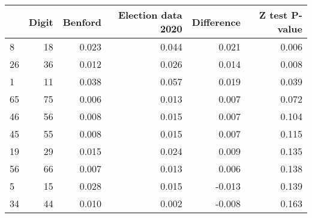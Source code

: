 \begin{tabular}{lrrrrr}
\toprule
{} &  Digit &  Benford &  Election data 2020 &  Difference &  Z test P-value \\
\midrule
8  &     18 &    0.023 &               0.044 &       0.021 &           0.006 \\
26 &     36 &    0.012 &               0.026 &       0.014 &           0.008 \\
1  &     11 &    0.038 &               0.057 &       0.019 &           0.039 \\
65 &     75 &    0.006 &               0.013 &       0.007 &           0.072 \\
46 &     56 &    0.008 &               0.015 &       0.007 &           0.104 \\
45 &     55 &    0.008 &               0.015 &       0.007 &           0.115 \\
19 &     29 &    0.015 &               0.024 &       0.009 &           0.135 \\
56 &     66 &    0.007 &               0.013 &       0.006 &           0.138 \\
5  &     15 &    0.028 &               0.015 &      -0.013 &           0.139 \\
34 &     44 &    0.010 &               0.002 &      -0.008 &           0.163 \\
\bottomrule
\end{tabular}
